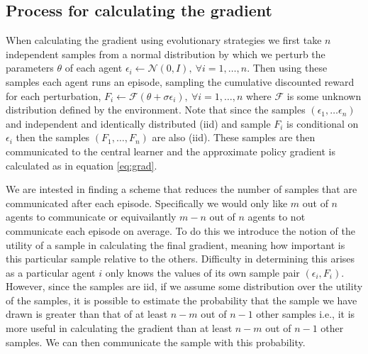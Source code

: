 \subsection{Process for calculating the gradient}
When calculating the gradient using evolutionary strategies we first take $n$ independent samples from a normal distribution by which we perturb the parameters $\theta$ of each agent $\epsilon_i \leftarrow \mathcal{N}(0,I), \ \forall i=1,\dots,n$. Then using these samples each agent runs an episode, sampling the cumulative discounted reward for each perturbation, $F_i \leftarrow \mathcal{F}(\theta+\sigma \epsilon_i), \ \forall i=1,\dots,n$ where $\mathcal{F}$ is some unknown distribution defined by the environment. Note that since the samples $(\epsilon_1,\dots\epsilon_n)$ and independent and identically distributed (iid) and sample $F_i$ is conditional on $\epsilon_i$ then the samples $(F_1,\dots,F_n)$ are also (iid). These samples are then communicated to the central learner and the approximate policy gradient is calculated as in equation \ref{eq:grad}.

We are intested in finding a scheme that reduces the number of samples that are communicated after each episode. Specifically we would only like $m$ out of $n$ agents to communicate or equivailantly $m-n$ out of $n$ agents to not communicate each episode on average. To do this we introduce the notion of the utility of a sample in calculating the final gradient, meaning how important is this particular sample relative to the others. Difficulty in determining this arises as a particular agent $i$ only knows the values of its own sample pair $(\epsilon_i, F_i)$. However, since the samples are iid, if we assume some distribution over the utility of the samples, it is possible to estimate the probability that the sample we have drawn is greater than that of at least $n-m$ out of $n-1$ other samples i.e., it is more useful in calculating the gradient than at least $n-m$ out of $n-1$ other samples. We can then communicate the sample with this probability.

